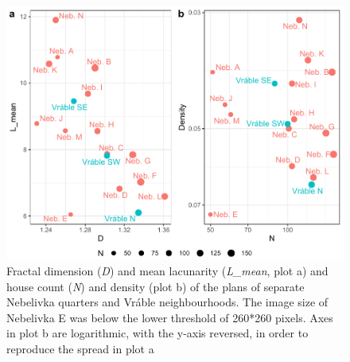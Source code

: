 \documentclass[
  12pt,
]{book}
\begin{document}
\begin{figure}

{\centering \includegraphics[width=0.9\linewidth]{bookdown-demo_files/figure-latex/09-quart-points-1} 

}

\caption{Fractal dimension (\emph{D}) and mean lacunarity (\emph{L\_mean}, plot a) and house count (\emph{N}) and density (plot b) of the plans of separate Nebelivka quarters and Vráble neighbourhoods. The image size of Nebelivka E was below the lower threshold of 260*260 pixels. Axes in plot b are logarithmic, with the y-axis reversed, in order to reproduce the spread in plot a}\label{fig:09-quart-points}
\end{figure}
\end{document}
